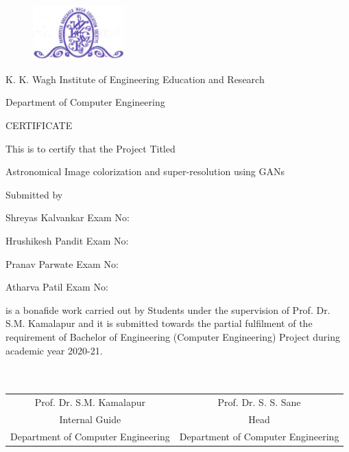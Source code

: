 \documentclass[oneside,a4paper,12pt]{report}
\begin{document}
\newpage



\begin{figure}[ht]
\centering
\includegraphics[width=100pt]{collegelogo.png}
\end{figure}


{\bfseries \fontsize{14}{12} \selectfont \centerline{K. K. Wagh Institute of Engineering Education and Research}
\centerline{Department of Computer Engineering}
\vspace*{3\baselineskip}}


{\bfseries \fontsize{16}{12} \selectfont \centerline{CERTIFICATE}
\vspace*{3\baselineskip}}

\centerline{This is to certify that the Project Titled}
\vspace*{1\baselineskip}


{\bfseries \fontsize{14}{12} \selectfont \centerline{Astronomical Image colorization and super-resolution using GANs}
\vspace*{1\baselineskip}}

\centerline{Submitted by}
\vspace*{1\baselineskip}
\centerline{Shreyas Kalvankar  \hspace{25 mm} Exam No: }
\centerline{Hrushikesh Pandit \hspace{25 mm} Exam No:  }
\centerline{Pranav Parwate \hspace{30 mm} Exam No: }
\centerline{Atharva Patil \hspace{34 mm} Exam No: }
\vspace*{1\baselineskip}
is a bonafide work carried out by Students under the supervision of Prof. Dr. S.M. Kamalapur and it
is submitted towards the partial fulfilment of the requirement of Bachelor of Engineering (Computer Engineering) Project during academic year 2020-21.\\\\\\

\bgroup
\def\arraystretch{0.7}
\begin{tabular}{c c }
Prof. Dr. S.M. Kamalapur &  \hspace{25 mm} Prof. Dr. S. S. Sane \\
Internal Guide   &  \hspace{25 mm} Head \\
Department of Computer Engineering  &	\hspace{25 mm}Department of Computer Engineering  \\
\end{tabular}
\end{document}
